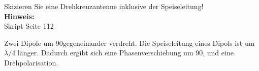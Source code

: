 \begin{question}[section=11,name={Drehkreuzantenne 2},difficulty=,quantity=6,type=thr,tags={20130314}]
	Skizieren Sie eine Drehkreuzantenne inklusive der Speiseleitung!
	\\ \textbf{Hinweis:}\\
	Skript Seite 112
\end{question}
\begin{solution}
	Zwei Dipole um 90\degree gegeneinander verdreht. Die Speiseleitung eines Dipols ist um $\lambda/4$ länger. Dadurch ergibt sich eine Phasenverschiebung um 90\degree, und eine Drehpolarisation.
\end{solution}